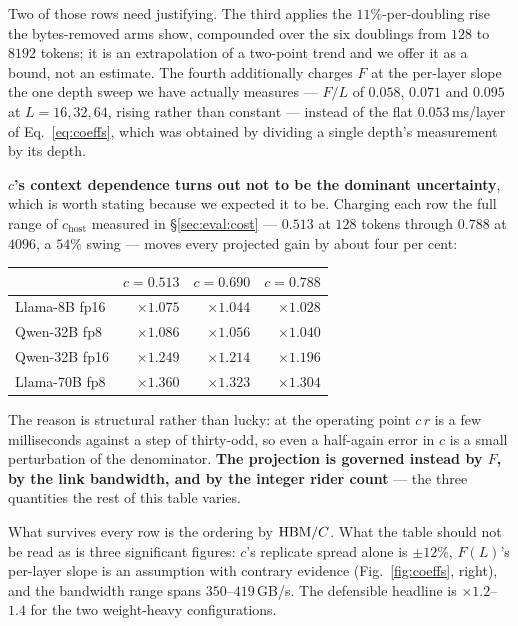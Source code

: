 Two of those rows need justifying. The third applies the $11\%$-per-doubling rise
the bytes-removed arms show, compounded over the six doublings from $128$ to $8192$
tokens; it is an extrapolation of a two-point trend and we offer it as a bound, not
an estimate. The fourth additionally charges $F$ at the per-layer slope the one
depth sweep we have actually measures --- $F/L$ of $0.058$, $0.071$ and $0.095$ at
$L = 16, 32, 64$, rising rather than constant --- instead of the flat
$0.053$\,ms/layer of Eq.~\ref{eq:coeffs}, which was obtained by dividing a single
depth's measurement by its depth.

\textbf{$c$'s context dependence turns out not to be the dominant uncertainty},
which is worth stating because we expected it to be. Charging each row the full
range of $c_{\mathrm{host}}$ measured in \S\ref{sec:eval:cost} --- $0.513$ at
$128$ tokens through $0.788$ at $4096$, a $54\%$ swing --- moves every projected
gain by about four per cent:

\begin{center}\small
\begin{tabular}{lrrr}
\toprule
 & $c = 0.513$ & $c = 0.690$ & $c = 0.788$ \\
\midrule
Llama-8B fp16  & $\times 1.075$ & $\times 1.044$ & $\times 1.028$ \\
Qwen-32B fp8   & $\times 1.086$ & $\times 1.056$ & $\times 1.040$ \\
Qwen-32B fp16  & $\times 1.249$ & $\times 1.214$ & $\times 1.196$ \\
Llama-70B fp8  & $\times 1.360$ & $\times 1.323$ & $\times 1.304$ \\
\bottomrule
\end{tabular}
\end{center}

The reason is structural rather than lucky: at the operating point $c\,r$ is a few
milliseconds against a step of thirty-odd, so even a half-again error in $c$ is a
small perturbation of the denominator. \textbf{The projection is governed instead by
$F$, by the link bandwidth, and by the integer rider count} --- the three quantities
the rest of this table varies.

What survives every row is the ordering by $\mathrm{HBM}/C$. What the table should not be
read as is three significant figures: $c$'s replicate spread alone is $\pm 12\%$,
$F(L)$'s per-layer slope is an assumption with contrary evidence
(Fig.~\ref{fig:coeffs}, right), and the bandwidth range spans $350$--$419$\,GB/s.
The defensible headline is $\times 1.2$--$1.4$ for the two weight-heavy
configurations.

